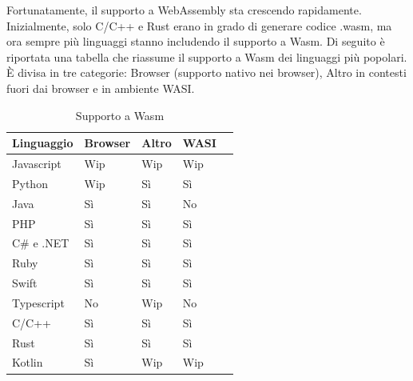 Fortunatamente, il supporto a WebAssembly sta crescendo rapidamente. Inizialmente, solo C/C++ e Rust erano in grado di
generare codice .wasm, ma ora sempre più linguaggi stanno includendo il supporto a Wasm. Di seguito è riportata una
tabella che riassume il supporto a Wasm  dei linguaggi più popolari\cite{most-popular-technologies-stack-overflow}. È
divisa in tre categorie: Browser (supporto nativo nei browser), Altro in contesti fuori dai browser e in ambiente WASI.
\begin{table}[H]
    \centering
    \begin{tabular}{|l|l|l|l|l|}
    \hline
        \textbf{Linguaggio} & \textbf{Browser} & \textbf{Altro} & \textbf{WASI} \\ \hline
        Javascript & Wip & Wip & Wip  \\ \hline
        Python & Wip & Sì & Sì  \\ \hline
        Java & Sì & Sì & No  \\ \hline
        PHP & Sì & Sì & Sì  \\ \hline
        C\# e .NET & Sì & Sì & Sì  \\ \hline
        Ruby & Sì & Sì & Sì  \\ \hline
        Swift & Sì & Sì & Sì  \\ \hline
        Typescript & No & Wip & No  \\ \hline
        C/C++ & Sì & Sì & Sì  \\ \hline
        Rust & Sì & Sì & Sì  \\ \hline
        Kotlin & Sì & Wip & Wip  \\ \hline
    \end{tabular}
    \caption{Supporto a Wasm}
\end{table}

